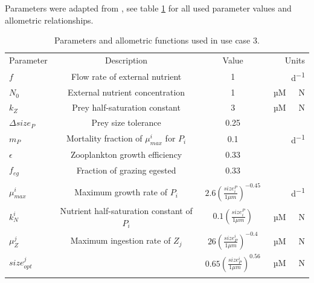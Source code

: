 \documentclass[journal abbreviation, manuscript]{copernicus}
\begin{document}
Parameters were adapted from \citet{Banas2011b}, see table \ref{Table:usecase3parameters} for all used parameter values and allometric relationships.
\begin{table}[t]
\caption{Parameters and allometric functions used in use case 3.}
\begin{tabular}{l c c r}
Parameter & Description & Value & Units \\
\tophline
$f$ & Flow rate of external nutrient & 1 & \unit{d^{-1}} \\
$N_0$ & External nutrient concentration & 1 & \unit{µM \ N} \\
$k_Z$ & Prey half-saturation constant & 3 & \unit{µM \ N}\\
$\Delta size_{P}$ & Prey size tolerance & 0.25 &  \\
$m_P$ & Mortality fraction of $\mu_{max}^i$ for $P_i$ & 0.1 & \unit{d^{-1}}\\
$\epsilon$ & Zooplankton growth efficiency & 0.33 & \\
$f_{eg}$ & Fraction of grazing egested & 0.33 & \\
\\

$\mu_{max}^i$ & Maximum growth rate of $P_i$ & $ 2.6 \left( \frac{size_i^{P}}{1\mu m} \right)^{-0.45}$  & \unit{d^{-1}} \\
$k_N^i$ & Nutrient half-saturation constant of $P_i$ & $ 0.1 \left( \frac{size_i^{P}}{1\mu m} \right)$ & \unit{µM \ N} \\

$\mu_Z^j$ & Maximum ingestion rate of $Z_j$ & $26 \left( \frac{size^i_{P}}{1\mu m} \right)^{-0.4}$ &\unit{µM \ N} \\

$size_{opt}^j$ &  & $0.65 \left( \frac{size_{P}^i}{1\mu m} \right)^{0.56}$ & \ \unit{µM \ N} \\

\bottomhline
\end{tabular}
\label{Table:usecase3parameters}
\end{table}
%


\noappendix       %

\end{document}

